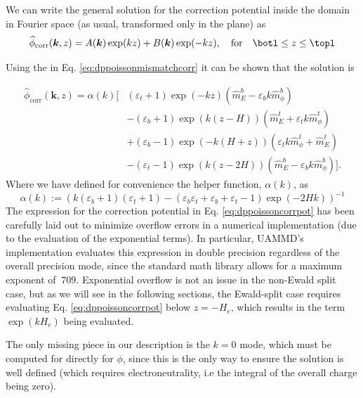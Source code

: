 \documentclass[ twoside,openright,titlepage,numbers=noenddot,%
headinclude,footinclude,cleardoublepage=empty,abstract=on,
BCOR=5mm,paper=b5,fontsize=11pt, dvipsnames
]{scrreprt}
\renewcommand{\vec}[1]{\bm{#1}}
\newcommand{\uammd}{\gls{UAMMD}\xspace}
\newcommand{\fou}[1]{\widehat{#1}}
\newcommand{\corr}{\text{corr}}
\begin{document}
We can write the general solution for the correction potential inside the domain in Fourier space (as usual, transformed only in the plane) as 
\begin{equation}
  \label{eq:dppoissoncorrpoteq}
  \fou{\phi}_{\corr}(\vec{k}, z) = A(\vec{k})\exp(k z) + B(\vec{k})\exp(-kz), \quad \text{for} \quad \botl\le z\le \topl
\end{equation}

Using the \bcs in Eq. \eqref{eq:dppoissonmismatchcorr} it can be shown that the solution is

\begin{equation}
  \label{eq:dppoissoncorrpot}
  \begin{aligned}
    \fou{\phi}_{\corr}(\vec{k}, z) = \alpha(k)\bigg[ &(\varepsilon_t +1)\exp(-k z)(\fou{m}_E^b - \varepsilon_bk \fou{m}_\phi^b)\\
    &-(\varepsilon_b+1)\exp\left(k\left(z-H\right)\right)(\fou{m}_E^t + \varepsilon_tk\fou{m}_\phi^t)\\
    &+(\varepsilon_b-1)\exp\left(-k(H+z)\right)(\varepsilon_tk\fou{m}_\phi^t + \fou{m}_E^t)\\
    &-(\varepsilon_t -1)\exp\left(k(z-2H)\right)(\fou{m}_E^b - \varepsilon_bk\fou{m}_\phi^b)
    \bigg].
\end{aligned}
\end{equation}
Where we have defined for convenience the helper function, $\alpha(k)$, as
\begin{equation}
  \alpha(k) := \left(k(\varepsilon_b +1)(\varepsilon_t+1) - (\varepsilon_b\varepsilon_t + \varepsilon_b + \varepsilon_t -1)\exp(-2Hk) \right)^{-1}
\end{equation}
The expression for the correction potential in Eq. \eqref{eq:dppoissoncorrpot} has been carefully laid out to minimize overflow errors in a numerical implementation (due to the evaluation of the exponential terms). In particular, \uammd's implementation evaluates this expression in double precision regardless of the overall precision mode, since the standard math library allows for a maximum exponent of $~709$. Exponential overflow is not an issue in the non-Ewald split case, but as we will see in the following sections, the Ewald-split case requires evaluating Eq. \eqref{eq:dppoissoncorrpot} below $z=-H_e$, which results in the term $\exp(kH_e)$ being evaluated.

The only missing piece in our description is the $k=0$ mode, which must be computed for directly for $\phi$, since this is the only way to ensure the solution is well defined (which requires electroneutrality, i.e the integral of the overall charge being zero).
 
\end{document}
